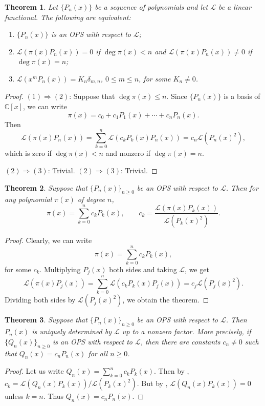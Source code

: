 \documentclass{amsart}
\numberwithin{equation}{section}
\newtheorem{thm}{Theorem}[section]
\theoremstyle{definition}
\newcommand{\CC}{\mathbb{C}}
\newcommand\LL{\mathcal{L}}
\begin{document}
\begin{thm}\label{thm:orth-equiv}
  Let \( \{P_n(x) \} \) be a sequence of polynomials and let \( \LL \) be
  a linear functional. The following are equivalent:
  \begin{enumerate}
  \item \( \{P_n(x) \} \) is an OPS with respect to \( \LL \);
  \item \( \LL(\pi(x) P_n(x)) = 0 \) if \( \deg \pi(x) < n \) and
    \( \LL(\pi(x) P_n(x)) \ne 0 \) if \( \deg \pi(x) = n \);
  \item \( \LL(x^m P_n(x)) = K_n \delta_{m,n} \), \( 0\le m\le n \), for some \( K_n\ne 0 \).
  \end{enumerate}
\end{thm}
\begin{proof}
\( (1) \Rightarrow (2) \):
Suppose that \( \deg \pi(x) \le n \).
Since \( \{P_n(x) \} \) is a basis of \( \CC[x] \), we can write
\[
  \pi(x) = c_0 + c_1 P_1(x) + \cdots + c_n P_n(x).
\]
Then
\[
  \LL(\pi(x) P_n(x)) = \sum_{k=0}^n \LL \left( c_k P_k(x) P_n(x) \right)
  = c_n \LL(P_n(x)^2),
\]
which is zero if \( \deg \pi(x) <n \) and nonzero if \( \deg \pi(x) =n \).

\( (2) \Rightarrow (3) \): Trivial.
\( (2) \Rightarrow (3) \): Trivial.
\end{proof}

\begin{thm}\label{thm:orth-coeff}
  Suppose that \( \{ P_n(x) \}_{n\ge 0} \) be an OPS with respect to \( \LL \).
  Then for any polynomial \( \pi(x) \) of degree \( n \),
\[
  \pi(x) = \sum_{k=0}^n  c_k P_k(x), \qquad
  c_k = \frac{\LL(\pi(x)P_k(x))}{\LL(P_k(x)^2)}.
\]
\end{thm}
\begin{proof}
  Clearly, we can write
  \[
    \pi(x) = \sum_{k=0}^n c_k P_k(x),
  \]
  for some \( c_k \). Multiplying \( P_j(x) \) both sides
  and taking \( \LL \), we get
  \[
    \LL(\pi(x) P_j(x)) = \sum_{k=0}^n \LL \left( c_k P_k(x) P_j(x) \right)
    = c_j \LL(P_j(x)^2).
  \]
  Dividing both sides by \( \LL(P_j(x)^2) \), we obtain the theorem.
\end{proof}

\begin{thm}\label{thm:uniqueness-OPS}
  Suppose that \( \{ P_n(x) \}_{n\ge 0} \) be an OPS with respect to
  \( \LL \). Then \( P_n(x) \) is uniquely determined by \( \LL \) up
  to a nonzero factor. More precisely, if \( \{ Q_n(x) \}_{n\ge 0} \)
  is an OPS with respect to \( \LL \), then there are constants
  \( c_n\ne0 \) such that \( Q_n(x) = c_n P_n(x) \) for all
  \( n\ge0 \).
\end{thm}
\begin{proof}
  Let us write \(Q_n(x) = \sum_{k=0}^n c_k P_k(x) \). Then by
  , \( c_k = \LL(Q_n(x)P_k(x))/\LL(P_k(x)^2) \).
  But by , \( \LL(Q_n(x)P_k(x)) = 0 \) unless
  \( k=n \). Thus \( Q_n(x) = c_n P_n(x) \).
\end{proof}
\end{document}
